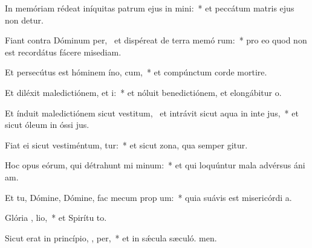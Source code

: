\item In memóriam rédeat iníquitas patrum ejus in  mini:~* et peccátum matris ejus non detur.
\item Fiant contra Dóminum per,~\pscross{} et dispéreat de terra memó rum:~* pro eo quod non est recordátus fácere misediam.
\item Et persecútus est hóminem íno,  cum,~* et compúnctum corde mortire.
\item Et diléxit maledictiónem, et  i:~* et nóluit benedictiónem, et elongábitur  o.
\item Et índuit maledictiónem sicut vestitum,~\pscross{} et intrávit sicut aqua in inte jus,~* et sicut óleum in óssi jus.
\item Fiat ei sicut vestiméntum,  tur:~* et sicut zona, qua semper gitur.
\item Hoc opus eórum, qui détrahunt mi  minum:~* et qui loquúntur mala advérsus áni am.
\item Et tu, Dómine, Dómine, fac mecum prop  um:~* quia suávis est misericórdi a.
\item Glória ,  lio,~* et Spirítu to.
\item Sicut erat in princípio,  ,  per,~* et in sǽcula sæculó. men.
